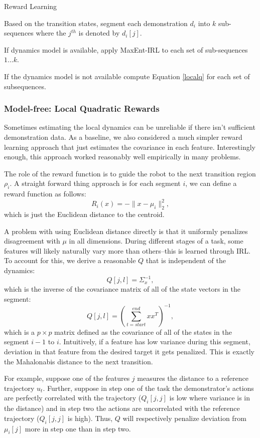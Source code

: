 \begin{phase}[t]
\small
\DontPrintSemicolon
\caption{Reward Learning \label{alg:tsh2}}

Based on the transition states, segment each demonstration $d_i$ into $k$ sub-sequences where the $j^{th}$ is denoted by $d_i[j]$.

If dynamics model is available, apply MaxEnt-IRL to each set of sub-sequences $1...k$.

If the dynamics model is not available compute Equation \ref{localq} for each set of subsequences.

\end{phase}

\subsubsection{Model-free: Local Quadratic Rewards}
Sometimes estimating the local dynamics can be unreliable if there isn't sufficient demonstration data.
As a baseline, we also considered a much simpler reward learning approach that just estimates the covariance in each feature.
Interestingly enough, this approach worked reasonably well empirically in many problems.

The role of the reward function is to guide the robot to the next transition region $\rho_i$.
A straight forward thing approach is for each segment $i$, we can define a reward function as follows:
\[
R_i(x) = -\|x - \mu_{i}\|_2^2, 
\]
which is just the Euclidean distance to the centroid.

A problem with using Euclidean distance directly is that it uniformly penalizes disagreement with $\mu$ in all dimensions.
During different stages of a task, some features will likely naturally vary more than others--this is learned through IRL.
To account for this, we derive a reasonable $Q$ that is independent of the dynamics:
\[
Q[j,l] = \Sigma^{-1}_x,
\]
which is the inverse of the covariance matrix of all of the state vectors in the segment:
\begin{equation}
Q[j,l] = (\sum_{t=start}^{end} x x^T)^{-1},
\label{localq}
\end{equation}
which is a $p \times p$ matrix defined as the covariance of all of the states in the segment $i-1$ to $i$.
Intuitively, if a feature has low variance during this segment, deviation in that feature from the desired target it gets penalized. 
This is exactly the Mahalonabis distance to the next transition. 

For example, suppose one of the features $j$ measures the distance to a reference trajectory $u_t$. 
Further, suppose in step one of the task the demonstrator's actions are perfectly correlated with the trajectory ($Q_{i}[j,j]$ is low where variance is in the distance) and in step two the actions are uncorrelated with the reference trajectory ($Q_{i}[j,j]$ is high).
Thus, $Q$ will respectively penalize deviation from $\mu_{i}[j]$ more in step one than in step two.